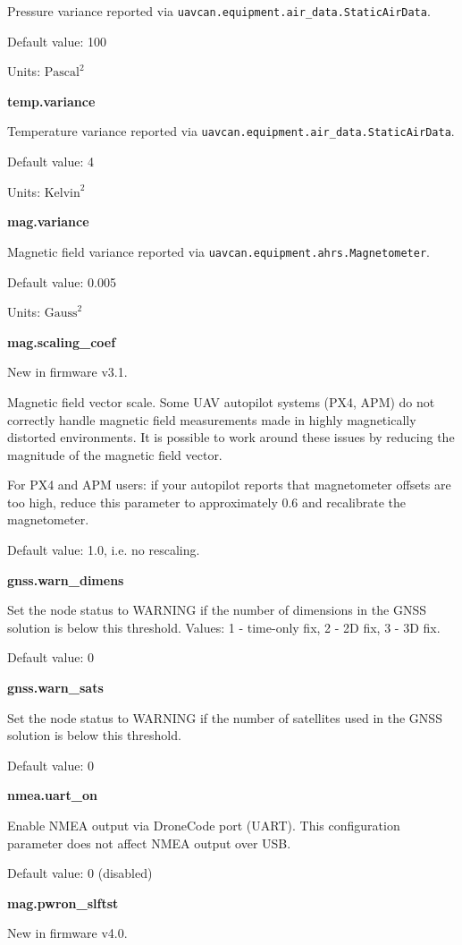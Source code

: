\documentclass{zubaxdoc}
\begin{document}
Pressure variance reported via \texttt{uavcan.equipment.air{\_}data.StaticAirData}.

Default value: 100

Units: $\text{Pascal}^2$

\textbf{temp.variance}

Temperature variance reported via \texttt{uavcan.equipment.air{\_}data.StaticAirData}.

Default value: 4

Units: $\text{Kelvin}^2$

\textbf{mag.variance}

Magnetic field variance reported via \texttt{uavcan.equipment.ahrs.Magnetometer}.

Default value: 0.005

Units: $\text{Gauss}^2$

\textbf{mag.scaling{\_}coef}

New in firmware v3.1.

Magnetic field vector scale. Some UAV autopilot systems (PX4, APM) do not correctly handle magnetic field measurements made in highly magnetically distorted environments. It is possible to work around these issues by reducing the magnitude of the magnetic field vector.

For PX4 and APM users: if your autopilot reports that magnetometer offsets are too high, reduce this parameter to approximately 0.6 and recalibrate the magnetometer.

Default value: 1.0, i.e. no rescaling.

\textbf{gnss.warn{\_}dimens}

Set the node status to WARNING if the number of dimensions in the GNSS solution is below this threshold. Values: 1 - time-only fix, 2 - 2D fix, 3 - 3D fix.

Default value: 0

\textbf{gnss.warn{\_}sats}

Set the node status to WARNING if the number of satellites used in the GNSS solution is below this threshold.

Default value: 0

\textbf{nmea.uart{\_}on}

Enable NMEA output via DroneCode port (UART). This configuration parameter does not affect NMEA output over USB.

Default value: 0 (disabled)

\textbf{mag.pwron{\_}slftst}

New in firmware v4.0.
\end{document}

